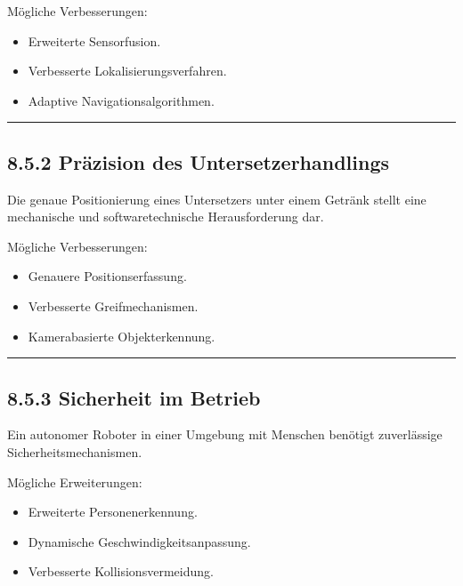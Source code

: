\documentclass[
]{article}
\providecommand{\tightlist}{%
  \setlength{\itemsep}{0pt}\setlength{\parskip}{0pt}}
\begin{document}
Mögliche Verbesserungen:

\begin{itemize}
\tightlist
\item
  Erweiterte Sensorfusion.
\item
  Verbesserte Lokalisierungsverfahren.
\item
  Adaptive Navigationsalgorithmen.
\end{itemize}

\begin{center}\rule{0.5\linewidth}{0.5pt}\end{center}

\subsection{8.5.2 Präzision des
Untersetzerhandlings}\label{pruxe4zision-des-untersetzerhandlings}

Die genaue Positionierung eines Untersetzers unter einem Getränk stellt
eine mechanische und softwaretechnische Herausforderung dar.

Mögliche Verbesserungen:

\begin{itemize}
\tightlist
\item
  Genauere Positionserfassung.
\item
  Verbesserte Greifmechanismen.
\item
  Kamerabasierte Objekterkennung.
\end{itemize}

\begin{center}\rule{0.5\linewidth}{0.5pt}\end{center}

\subsection{8.5.3 Sicherheit im Betrieb}\label{sicherheit-im-betrieb}

Ein autonomer Roboter in einer Umgebung mit Menschen benötigt
zuverlässige Sicherheitsmechanismen.

Mögliche Erweiterungen:

\begin{itemize}
\tightlist
\item
  Erweiterte Personenerkennung.
\item
  Dynamische Geschwindigkeitsanpassung.
\item
  Verbesserte Kollisionsvermeidung.
\end{itemize}
\end{document}
